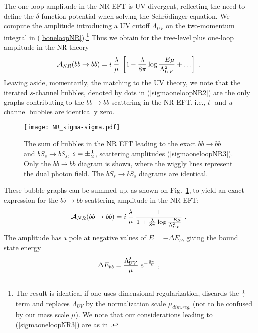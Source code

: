 \documentclass[11pt]{article}
\begin{document}
The one-loop amplitude in the NR EFT is UV divergent, reflecting the need to define the $\delta$-function potential when solving the Schr\" odinger equation. We compute the amplitude introducing a UV cutoff $\Lambda_{UV}$ on the two-momentum integral in (\ref{boneloopNR}).\footnote{The result is identical if one uses dimensional regularization, discards the $1\over \epsilon$ term and replaces $\Lambda_{UV}$ by the normalization scale $\mu_{dim.reg.}$ (not to be confused by our mass scale $\mu$). We note that our considerations leading to (\ref{sigmaoneloopNR3}) are as in \cite{Kaplan:2005es}.} Thus we obtain for the tree-level plus one-loop amplitude in the NR theory
 \begin{equation}
\label{sigmaoneloopNR2}
{\cal{A}}_{NR} (bb \rightarrow bb)  =   i \;{ \lambda \over \mu} \; \left[ 1- {\lambda \over 8 \pi}\log {- E \mu  \over \Lambda_{UV}^2} + \ldots\right]~.
\end{equation}
Leaving aside, momentarily, the  matching to the UV theory, we note that the iterated $s$-channel bubbles, denoted by dots in (\ref{sigmaoneloopNR2})  are the only graphs contributing to the $bb\rightarrow bb$ scattering in the NR EFT, i.e., $t$- and $u$-channel bubbles are identically zero.
\begin{figure}[t] %
   \centering
   \texttt{[image: NR\_sigma-sigma.pdf]} 
   \caption{The sum of bubbles in the NR EFT leading to the exact $bb \rightarrow bb$ and $b S_s \rightarrow b S_s$, $s = \pm{1 \over 2}$, scattering amplitudes (\ref{sigmaoneloopNR3}). Only the $bb \rightarrow bb$ diagram is shown, where the wiggly lines represent the dual photon field. The  $b S_s \rightarrow b S_s$ diagrams are identical.}
	\label{bubblesNREFT1}
\end{figure} 
These bubble graphs can be summed up, as shown on Fig.~\ref{bubblesNREFT1}, to yield an exact expression for the $bb \rightarrow bb$ scattering amplitude in the NR EFT:
 \begin{equation}
\label{sigmaoneloopNR3}
{\cal{A}}_{NR} (bb \rightarrow bb)  =   i \;{ \lambda \over \mu}\; {1 \over  1+ {\lambda \over 8 \pi}\log {- E \mu  \over \Lambda_{UV}^2}}~.
\end{equation}
The amplitude has a pole at negative values of $E = - \Delta E_{bb}$  giving  the bound state energy 
\begin{equation}
\label{pole}
\Delta E_{bb} = {\Lambda_{UV}^2 \over \mu} \; e^{ - {8 \pi \over \lambda}}~,
\end{equation}
\end{document}
